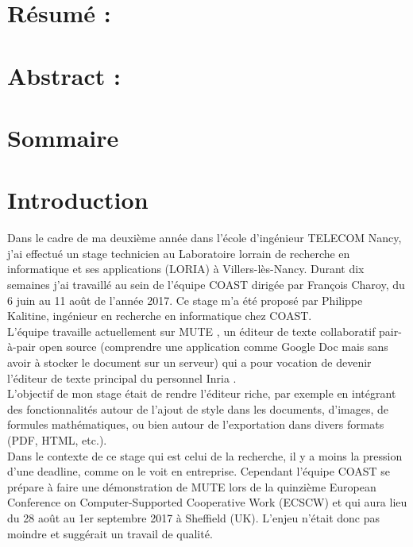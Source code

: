 \documentclass[12pt]{article}
\begin{document}
\newpage

\newpage
\section*{Résumé :}

\section*{Abstract :}



\newpage
\section*{Sommaire}
\tableofcontents

\newpage
\setcounter{page}{1}
\section*{Introduction}
Dans le cadre de ma deuxième année dans l'école d'ingénieur TELECOM Nancy, j'ai effectué un stage technicien au Laboratoire lorrain de recherche en informatique et ses applications (LORIA) \cite{loria} à Villers-lès-Nancy. Durant dix semaines j'ai travaillé au sein de l'équipe COAST \cite{coast} dirigée par François Charoy, du 6 juin au 11 août de l'année 2017. Ce stage m'a été proposé par Philippe Kalitine, ingénieur en recherche en informatique chez COAST.\\

L'équipe travaille actuellement sur MUTE \cite{mute}, un éditeur de texte collaboratif pair-à-pair open source (comprendre une application comme Google Doc mais sans avoir à stocker le document sur un serveur) qui a pour vocation de devenir l'éditeur de texte principal du personnel Inria \cite{inria}.\\

L'objectif de mon stage était de rendre l'éditeur riche, par exemple en intégrant des fonctionnalités autour de l'ajout de style dans les documents, d'images, de formules mathématiques, ou bien autour de l'exportation dans divers formats (PDF, HTML, etc.).\\

Dans le contexte de ce stage qui est celui de la recherche, il y a moins la pression d'une deadline, comme on le voit en entreprise. Cependant l'équipe COAST se prépare à faire une démonstration de MUTE lors de la quinzième European Conference on Computer-Supported Cooperative Work (ECSCW) \cite{ecscw} et qui aura lieu du 28 août au 1er septembre 2017 à Sheffield (UK). L'enjeu n'était donc pas moindre et suggérait un travail de qualité.
\end{document}
